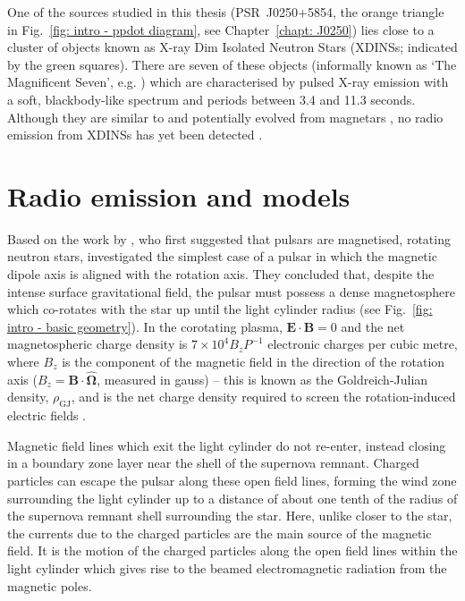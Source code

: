 One of the sources studied in this thesis (PSR~J0250+5854, the orange triangle in Fig.~\ref{fig: intro - ppdot diagram}, see Chapter~\ref{chapt: J0250}) lies close to a cluster of objects known as X-ray Dim Isolated Neutron Stars (XDINSs; indicated by the green squares). There are seven of these objects (informally known as `The Magnificent Seven', e.g. \citealt{Hxxx2007}) which are characterised by pulsed X-ray emission with a soft, blackbody-like spectrum and periods between 3.4 and 11.3 seconds. Although they are similar to and potentially evolved from magnetars \citep{VRP+2013}, no radio emission from XDINSs has yet been detected \citep{Jxxx2003, KKM+2003, KML+2009}.









\section{Radio emission and models}
\label{sec: intro - emission models}

Based on the work by \citet{Gxxx1968}, who first suggested that pulsars are magnetised, rotating neutron stars, \citet{GJxx1969} investigated the simplest case of a pulsar in which the magnetic dipole axis is aligned with the rotation axis. They concluded that, despite the intense surface gravitational field, the pulsar must possess a dense magnetosphere which co-rotates with the star up until the light cylinder radius (see Fig.~\ref{fig: intro - basic geometry}). In the corotating plasma, $\mathbf{E}\cdot\mathbf{B} = 0$ and the net magnetospheric charge density is $7\times10^4 B_z P^{-1}$ electronic charges per cubic metre, where $B_z$ is the component of the magnetic field in the direction of the rotation axis ($B_z = \mathbf{B}\cdot\mathbf{\hat{\Omega}}$, measured in gauss) -- this is known as the Goldreich-Julian density, $\rho_\mathrm{GJ}$, and is the net charge density required to screen the rotation-induced electric fields \citep{GJxx1969}.

Magnetic field lines which exit the light cylinder do not re-enter, instead closing in a boundary zone layer near the shell of the supernova remnant. Charged particles can escape the pulsar along these open field lines, forming the wind zone surrounding the light cylinder up to a distance of about one tenth of the radius of the supernova remnant shell surrounding the star. Here, unlike closer to the star, the currents due to the charged particles are the main source of the magnetic field. It is the motion of the charged particles along the open field lines within the light cylinder which gives rise to the beamed electromagnetic radiation from the magnetic poles.

